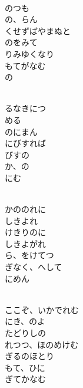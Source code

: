 \documentclass[10pt,b5j]{tarticle} %
\begin{document}
\begin{enumerate}
\begin{minipage}[c]{\blocksize}
        \vspace{\linespace}
        \item~\\
        のつも\\
        の、らん\\
        くせずばやまぬと\\
        のをみて\\
        りみゆくなり\\
        もてがなむ\\
        の
        
        \vspace{\linespace}
        \item~\\
        るなきにつ\\
        める\\
        のにまん\\
        にびすれば\\
        びすの\\
        か、の\\
        にむ
        
        \vspace{\linespace}
        \item~\\
        かののれに\\
        しきよれ\\
        けきりのに\\
        しきよがれ\\
        ら、をけてつ\\
        ぎなく、へして\\
        にめん
        
        \vspace{\linespace}
        \item~\\
        ここぞ、いかでれむ\\
        にき、のよ\\
        たどりしの\\
        れつつ、ほのめけむ\\
        ぎるのほとり\\
        もて、ひに\\
        ぎてかなむ
    

\end{minipage}
\end{enumerate}
\end{document}
